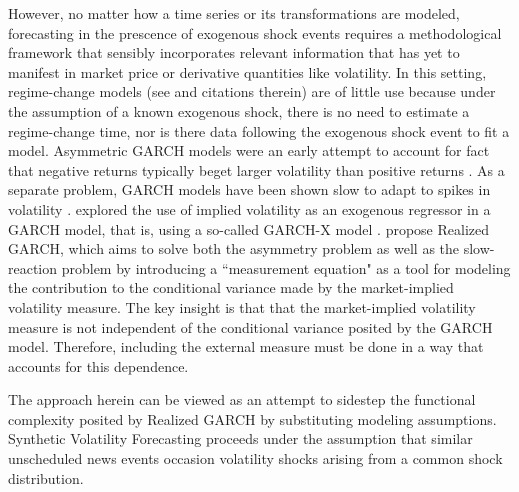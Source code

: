 \documentclass[11pt]{article}
\theoremstyle{definition}
\begin{document}
However, no matter how a time series or its transformations are modeled, forecasting in the prescence of exogenous shock events requires a methodological framework that sensibly incorporates relevant information that has yet to manifest in market price or derivative quantities like volatility.  In this setting, regime-change models (see \citet{bauwens2006regime} and citations therein) are of little use because under the assumption of a known exogenous shock, there is no need to estimate a regime-change time, nor is there data following the exogenous shock event to fit a model.  Asymmetric GARCH models were an early attempt to account for fact that negative returns typically beget larger volatility than positive returns \citep{hansen2012realized}.  As a separate problem, GARCH models have been shown slow to adapt to spikes in volatility \citep{andersen2003modeling}.  \citet{engle2002new} explored the use of implied volatility as an exogenous regressor in a GARCH model, that is, using a so-called GARCH-X model \citep{RePEc:pra:mprapa:100301}. \citet{hansen2012realized} propose Realized GARCH, which aims to solve both the asymmetry problem as well as the slow-reaction problem by introducing a ``measurement equation" as a tool for modeling the contribution to the conditional variance made by the market-implied volatility measure.  The key insight is that that the market-implied volatility measure is not independent of the conditional variance posited by the GARCH model.  Therefore, including the external measure must be done in a way that accounts for this dependence.

The approach herein can be viewed as an attempt to sidestep the functional complexity posited by Realized GARCH by substituting modeling assumptions.  Synthetic Volatility Forecasting proceeds under the assumption that similar unscheduled news events occasion volatility shocks arising from a common shock distribution.
\end{document}
